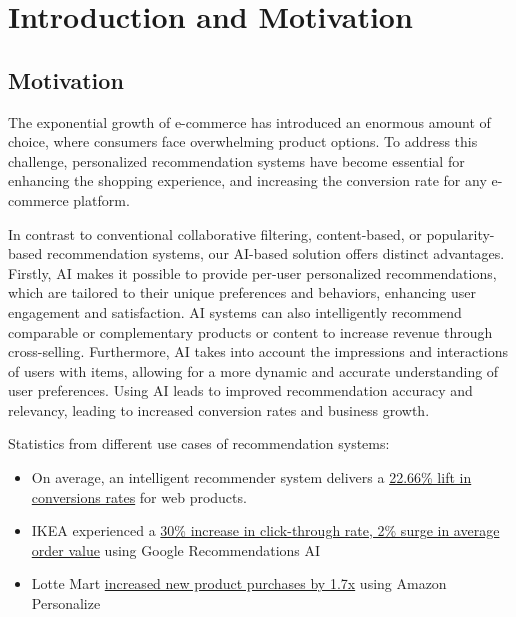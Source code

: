 \chapter{Introduction and Motivation}
\minitoc

\section{Motivation}

The exponential growth of e-commerce has introduced an enormous amount of choice, where consumers face overwhelming product options. To address this challenge, personalized recommendation systems have become essential for enhancing the shopping experience, and increasing the conversion rate for any e-commerce platform.

In contrast to conventional collaborative filtering\cite{NvidiaRecSys}, content-based\cite{NvidiaRecSys}, or popularity-based recommendation systems, our AI-based solution offers distinct advantages. Firstly, AI makes it possible to provide per-user personalized recommendations, which are tailored to their unique preferences and behaviors, enhancing user engagement and satisfaction. AI systems can also intelligently recommend comparable or complementary products or content to increase revenue through cross-selling. Furthermore, AI takes into account the impressions and interactions of users with items, allowing for a more dynamic and accurate understanding of user preferences. Using AI leads to improved recommendation accuracy and relevancy, leading to increased conversion rates and business growth.
    




Statistics from different use cases of recommendation systems:

\begin{itemize}
    \item On average, an intelligent recommender system delivers a \underline{22.66\% lift in conversions rates} \cite{salesforce2014predictive} for web products.
    \item IKEA experienced a \underline{30\% increase in click-through rate, 2\% surge in average order value} \cite{IkeaRecAtGoogleCloudSummit}  using Google Recommendations AI \cite{GoogleRecommendationsAI}
    \item Lotte Mart \underline{increased new product purchases by 1.7x} \cite{LotteMartAwsPersonalize} using Amazon Personalize \cite{AWSPersonalize}

\end{itemize}

